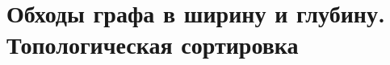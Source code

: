 \documentclass[discrete.tex]{subfiles}
\begin{document}
\section{Обходы графа в ширину и глубину. Топологическая сортировка}
\end{document}
